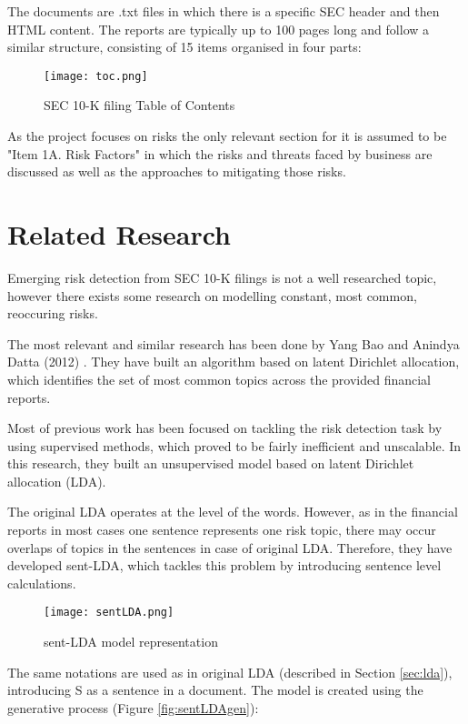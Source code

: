 The documents are .txt files in which there is a specific SEC header and then HTML content. The reports are typically up to 100 pages long and follow a similar structure, consisting of 15 items organised in four parts:

\begin{figure}[H]
\texttt{[image: toc.png]}
\caption{SEC 10-K filing Table of Contents}
\end{figure}

As the project focuses on risks the only relevant section for it is assumed to be "Item 1A. Risk Factors" in which the risks and threats faced by business are discussed as well as the approaches to mitigating those risks.

\section{Related Research}
Emerging risk detection from SEC 10-K filings is not a well researched topic, however there exists some research on modelling constant, most common, reoccuring risks.

The most relevant and similar research has been done by Yang Bao and Anindya Datta (2012) \cite{riskpaper1}. They have built an algorithm based on latent Dirichlet allocation, which identifies the set of most common topics across the provided financial reports.

Most of previous work has been focused on tackling the risk detection task by using supervised methods, which proved to be fairly inefficient and unscalable. In this research, they built an unsupervised model based on latent Dirichlet allocation (LDA). 

The original LDA operates at the level of the words. However, as in the financial reports in most cases one sentence represents one risk topic, there may occur overlaps of topics in the sentences in case of original LDA. Therefore, they have developed sent-LDA, which tackles this problem by introducing sentence level calculations.

\begin{figure}[H]
\begin{center}
\texttt{[image: sentLDA.png]}
\caption{sent-LDA model representation \cite{riskpaper1}}
\end{center}
\end{figure}

The same notations are used as in original LDA (described in Section \ref{sec:lda}), introducing S as a sentence in a document. The model is created using the generative process (Figure \ref{fig:sentLDAgen}):

